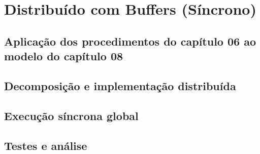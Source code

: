 \section{Distribuído com Buffers (Síncrono)}

\subsection{Aplicação dos procedimentos do capítulo 06 ao modelo do capítulo 08}

\subsection{Decomposição e implementação distribuída}

\subsection{Execução síncrona global}

\subsection{Testes e análise}


